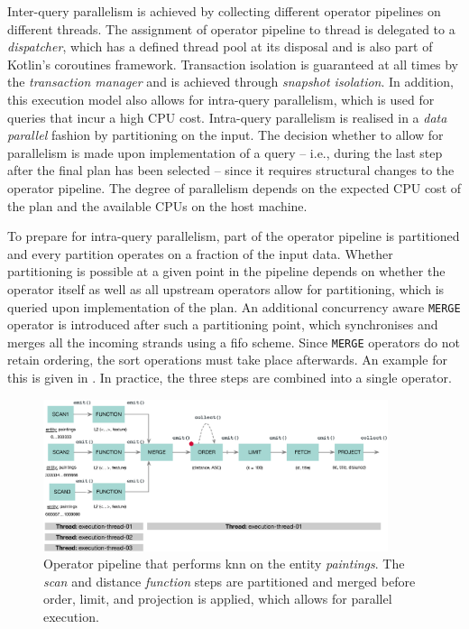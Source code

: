 Inter-query parallelism is achieved by collecting different operator pipelines on different threads. The assignment of operator pipeline to thread is delegated to a \emph{dispatcher}, which has a defined thread pool at its disposal and is also part of Kotlin's coroutines framework. Transaction isolation is guaranteed at all times by the \emph{transaction manager} and is achieved through \emph{snapshot isolation}. In addition, this execution model also allows for intra-query parallelism, which is used for queries that incur a high CPU cost. Intra-query parallelism is realised in a \emph{data parallel} fashion by partitioning on the input. The decision whether to allow for parallelism is made upon implementation of a query -- i.e., during the last step after the final plan has been selected -- since it requires structural changes to the operator pipeline. The degree of parallelism depends on the expected CPU cost of the plan and the available CPUs on the host machine.

To prepare for intra-query parallelism, part of the operator pipeline is partitioned and every partition operates on a fraction of the input data. Whether partitioning is possible at a given point in the pipeline depends on whether the operator itself as well as all upstream operators allow for partitioning, which is queried upon implementation of the plan. An additional concurrency aware \texttt{MERGE} operator is introduced after such a partitioning point, which synchronises and merges all the incoming strands using a \acrshort{fifo} scheme. Since \texttt{MERGE} operators do not retain ordering, the sort operations must take place afterwards. An example for this is given in . In practice, the three steps are combined into a single operator.

\begin{figure}[bt]
    \centering
    \includegraphics[width=0.9\textwidth]{figures/execution-model-parallel}
    \caption{Operator pipeline that performs \acrshort{knn} on the entity \emph{paintings}. The \emph{scan} and distance \emph{function} steps are partitioned and merged before order, limit, and projection is applied, which allows for parallel execution.}
    \label{figure:cottontail_execution_model_parallel}
\end{figure}

